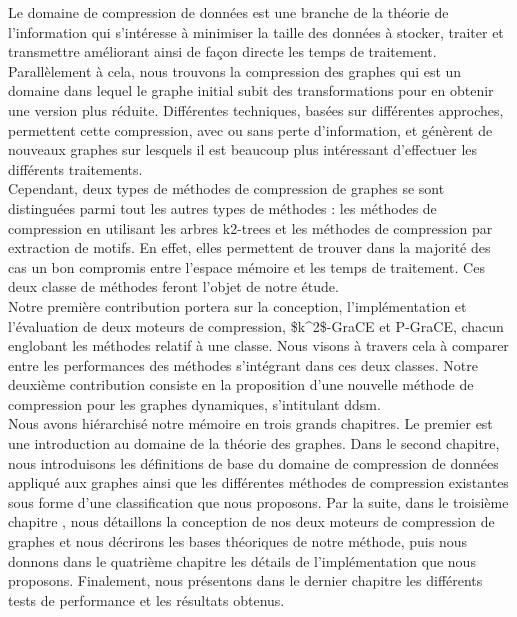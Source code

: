 \documentclass[a4paper,oneside,12pt]{report}
\theoremstyle{definition}
\begin{document}
	Le domaine de compression de données est une branche de la théorie de l'information qui s'intéresse à minimiser la taille des données à stocker, traiter et transmettre améliorant ainsi de façon directe les temps de traitement. Parallèlement à cela, nous trouvons la compression des graphes qui est un domaine dans lequel le graphe initial subit des transformations pour en obtenir une version plus réduite. Différentes techniques, basées sur différentes approches, permettent cette compression, avec ou sans perte d'information, et génèrent de nouveaux graphes sur lesquels il est beaucoup plus intéressant d'effectuer les différents traitements.\\ 

Cependant, deux types de méthodes de compression de graphes se sont distinguées parmi tout les autres types de méthodes : les méthodes de compression en utilisant les arbres k2-trees et les méthodes de compression par extraction de motifs. En effet, elles permettent de trouver dans la majorité des cas un bon compromis entre l'espace mémoire et les temps de traitement. Ces deux classe de méthodes feront l'objet de notre étude.\\
		
			Notre première contribution  portera sur la conception, l'implémentation et l'évaluation de 	deux moteurs de compression, 
			\gls{$k^2$-GraCE} 
			 et \gls{P-GraCE}, chacun englobant les méthodes relatif à une classe. Nous visons à travers cela à comparer entre les performances des méthodes s'intégrant dans ces deux classes. Notre deuxième contribution consiste en la proposition d'une nouvelle méthode de compression pour les graphes dynamiques, s'intitulant 
			 \gls{ddsm}. \\
			
			
			 Nous avons hiérarchisé notre mémoire en trois grands chapitres. Le premier est une introduction au domaine de la théorie des graphes. Dans le second chapitre, nous introduisons les définitions de base du domaine de compression de données appliqué aux graphes ainsi que les différentes méthodes de compression existantes sous forme d'une classification que nous proposons. Par la suite, dans le troisième chapitre , nous détaillons la conception de nos deux moteurs de compression de graphes et nous décrirons les bases théoriques de notre méthode, puis nous donnons dans le quatrième chapitre  les détails de l'implémentation que nous proposons. Finalement, nous présentons dans le dernier chapitre les différents tests de performance et les résultats obtenus.
	
\end{document}
